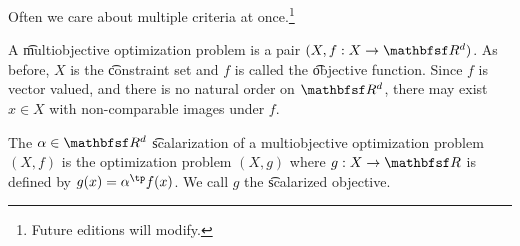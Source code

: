 

Often we care about multiple criteria at once.\footnote{Future editions will modify.}


A \t{multiobjective optimization problem} is a pair $(X, f: X \to \R^d)$.
As before, $X$ is the \t{constraint set} and $f$ is called the \t{objective function}.
Since $f$ is vector valued, and there is no natural order on $\R^d$, there may exist $x \in X$ with non-comparable images under $f$.


The $\alpha \in \R^d$ \t{scalarization} of a multiobjective optimization problem $(X, f)$ is the optimization problem $(X, g)$ where $g: X \to \R$ is defined by $g(x) = \alpha^\tp f(x)$.
We call $g$ the \t{scalarized objective}.

\blankpage
